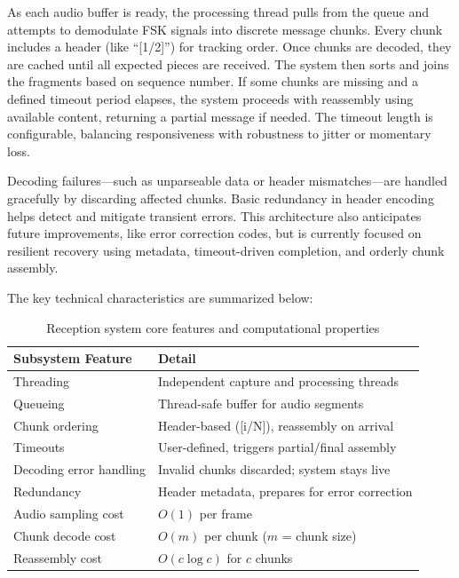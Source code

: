 \documentclass[12pt,openany]{article}
\theoremstyle{definition}
\theoremstyle{definition}
\theoremstyle{definition}
\begin{document}
As each audio buffer is ready, the processing thread pulls from the queue and attempts to demodulate FSK signals into discrete message chunks. Every chunk includes a header (like “[1/2]”) for tracking order. Once chunks are decoded, they are cached until all expected pieces are received. The system then sorts and joins the fragments based on sequence number. If some chunks are missing and a defined timeout period elapses, the system proceeds with reassembly using available content, returning a partial message if needed. The timeout length is configurable, balancing responsiveness with robustness to jitter or momentary loss.

Decoding failures—such as unparseable data or header mismatches—are handled gracefully by discarding affected chunks. Basic redundancy in header encoding helps detect and mitigate transient errors. This architecture also anticipates future improvements, like error correction codes, but is currently focused on resilient recovery using metadata, timeout-driven completion, and orderly chunk assembly.

The key technical characteristics are summarized below:

\begin{table}[h!]
\centering
\begin{tabular}{|l|l|}
\hline
\textbf{Subsystem Feature}   & \textbf{Detail} \\
\hline
Threading                   & Independent capture and processing threads \\
Queueing                    & Thread-safe buffer for audio segments \\
Chunk ordering              & Header-based ([i/N]), reassembly on arrival \\
Timeouts                    & User-defined, triggers partial/final assembly \\
Decoding error handling     & Invalid chunks discarded; system stays live \\
Redundancy                  & Header metadata, prepares for error correction \\
Audio sampling cost         & $O(1)$ per frame \\
Chunk decode cost           & $O(m)$ per chunk ($m$ = chunk size) \\
Reassembly cost             & $O(c \log c)$ for $c$ chunks \\
\hline
\end{tabular}
\caption{Reception system core features and computational properties}
\end{table}
\end{document}
